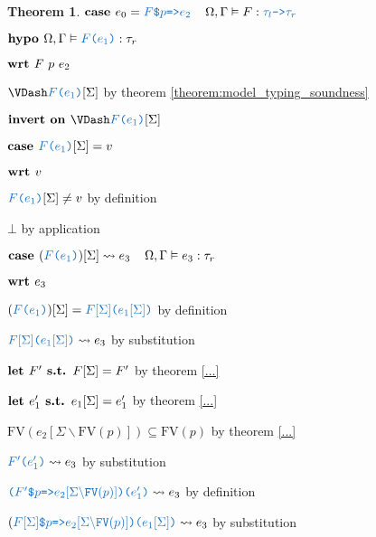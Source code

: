 \documentclass[acmsmall]{acmart}
\theoremstyle{definition}
\newtheorem{theorem}{Theorem}[section]
\begin{document}
\begin{theorem}
    \item \Z $\B{case }
      e_0 = \obj{$F$\$$p$=>$e_2$}
      \I
      \Omega, \Gamma \satisfies F \hastype \obj{$\tau_l$->$\tau_r$}
    $ 
    \item \Z $\B{hypo }
      \Omega, \Gamma \satisfies \obj{$F$($e_1$)} \hastype \tau_r
    $
    \item \Z $\textbf{wrt }
      F\ p\ e_2 
    $
      \item \Z\Z $\VDash \obj{$F$($e_1$)}[\Sigma] $
      by theorem \ref{theorem:model_typing_soundness}
      \item \Z\Z $\B{invert on } \VDash \obj{$F$($e_1$)}[\Sigma]$
      \item \Z\Z $\B{case } \obj{$F$($e_1$)}[\Sigma] = v$
      \item \Z\Z $\textbf{wrt } v$
        \item \Z\Z\Z $\obj{$F$($e_1$)}[\Sigma] \neq v$ by definition 
        \item \Z\Z\Z $\bot$ by application
      \item \Z\Z $\B{case } 
        (\obj{$F$($e_1$)})[\Sigma] \rightsquigarrow e_3
        \I
        \Omega, \Gamma \satisfies e_3 \hastype \tau_r
      $
      \item \Z\Z $\textbf{wrt } e_3$
        \item \Z\Z\Z $(\obj{$F$($e_1$)})[\Sigma] = \obj{$F[\Sigma]$($e_1[\Sigma]$)}$ by definition
        \item \Z\Z\Z $\obj{$F[\Sigma]$($e_1[\Sigma]$)} \rightsquigarrow e_3$ by substitution 

        \item \Z\Z\Z $\textbf{let } F' \textbf{ s.t. } F[\Sigma] = F'$ by theorem \ref{...} 
        \item \Z\Z\Z $\textbf{let } e_1' \textbf{ s.t. } e_1[\Sigma] = e_1'$ by theorem \ref{...} 

        \item \Z\Z\Z $\text{FV}(e_2[\Sigma\backslash\text{FV}(p)]) \subseteq \text{FV}(p)$ 
        by theorem \ref{...} 

        \item \Z\Z\Z $\obj{$F'$($e_1'$)} \rightsquigarrow e_3$ by substitution 
        \item \Z\Z\Z $\obj{($F'$\$$p$=>$e_2[\Sigma\backslash\text{FV}(p)]$)($e_1'$)} \rightsquigarrow e_3$ by definition 
        \item \Z\Z\Z $(\obj{$F[\Sigma]$\$$p$=>$e_2[\Sigma\backslash\text{FV}(p)]$)($e_1[\Sigma]$)} \rightsquigarrow e_3$ by substitution 


\end{theorem}
\end{document}
